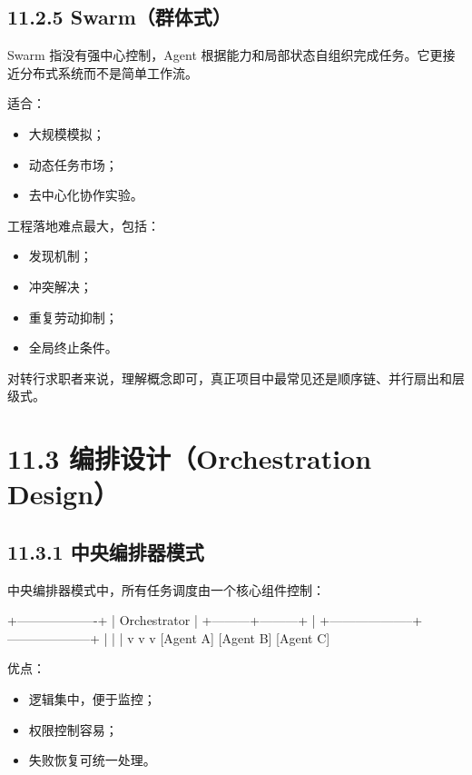\subsection{11.2.5 Swarm（群体式）}

Swarm 指没有强中心控制，Agent 根据能力和局部状态自组织完成任务。它更接近分布式系统而不是简单工作流。


适合：


\begin{itemize}[leftmargin=2em]
\item 大规模模拟；
\item 动态任务市场；
\item 去中心化协作实验。
\end{itemize}

工程落地难点最大，包括：


\begin{itemize}[leftmargin=2em]
\item 发现机制；
\item 冲突解决；
\item 重复劳动抑制；
\item 全局终止条件。
\end{itemize}

对转行求职者来说，理解概念即可，真正项目中最常见还是顺序链、并行扇出和层级式。


\section{11.3 编排设计（Orchestration Design）}

\subsection{11.3.1 中央编排器模式}

中央编排器模式中，所有任务调度由一个核心组件控制：


\begin{codeblock}
                   +-------------------+
                   |   Orchestrator    |
                   +---------+---------+
                             |
        +--------------------+--------------------+
        |                    |                    |
        v                    v                    v
   [Agent A]            [Agent B]            [Agent C]
\end{codeblock}

优点：


\begin{itemize}[leftmargin=2em]
\item 逻辑集中，便于监控；
\item 权限控制容易；
\item 失败恢复可统一处理。
\end{itemize}

